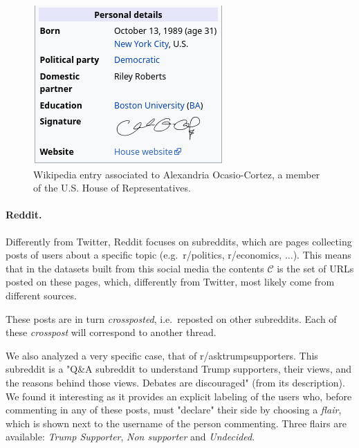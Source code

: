 
\begin{figure}
	\centering
	\includegraphics[width=0.4\linewidth]{tex/img/wikipedia-elected.png}
	\caption[Example Wikipedia entry]{Wikipedia entry associated to Alexandria Ocasio-Cortez, a member
		of the U.S. House of Representatives.}%
	\label{fig:tex/img/wikipedia-elected}
\end{figure}

\paragraph{Reddit.}%
\label{par:reddit}

Differently from Twitter, Reddit focuses on subreddits, which are pages
collecting posts of users about a specific topic (e.g.\ r/politics,
r/economics, $\dots$). This means that
in the datasets built from this social media the contents $\mathcal{C} $ is the
set of URLs posted on these pages, which, differently from Twitter, most likely
come from different sources.

These posts are in turn \emph{crossposted}, i.e.\ reposted on other subreddits. Each of
these \emph{crosspost} will correspond to another thread.

We also analyzed a
very specific case, that of r/asktrumpsupporters. This subreddit is a "Q\&A
subreddit to understand Trump supporters, their views, and the reasons behind
those views. Debates are discouraged" (from its description). We found it interesting as it provides an explicit labeling of the
users who, before commenting in any of these posts, must "declare" their side
by choosing a \emph{flair}, which is shown next to the username of the person
commenting.  Three flairs are available: \emph{Trump Supporter}, \emph{Non
	supporter} and \emph{Undecided}.

